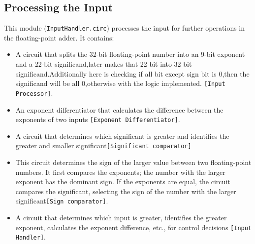 \documentclass[a4paper,12pt]{article}
\begin{document}
\subsection{Processing the Input}

This module (\texttt{InputHandler.circ}) processes the input for further
operations in the floating-point adder. It contains:

\begin{itemize}

    \item A circuit that splits the 32-bit floating-point number into an 9-bit exponent
          and a 22-bit significand,later makes that 22 bit into 32 bit
          significand.Additionally here is checking if all bit except sign bit is 0,then
          the significand will be all 0,otherwise with the logic implemented.
          \texttt{[Input Processor]}.
    \item An exponent differentiator that calculates the difference between the exponents
          of two inputs \texttt{[Exponent Differentiator]}.
    \item A circuit that determines which significant is greater and identifies the
          greater and smaller significant\texttt{[Significant comparator]}

    \item This circuit determines the sign of the larger value between two floating-point
          numbers. It first compares the exponents; the number with the larger exponent
          has the dominant sign. If the exponents are equal, the circuit compares the
          significant, selecting the sign of the number with the larger
          significant\texttt{[Sign comparator]}.

    \item A circuit that determines which input is greater, identifies the greater
          exponent, calculates the exponent difference, etc., for control decisions
          \texttt{[Input Handler]}.
\end{itemize}
\end{document}
